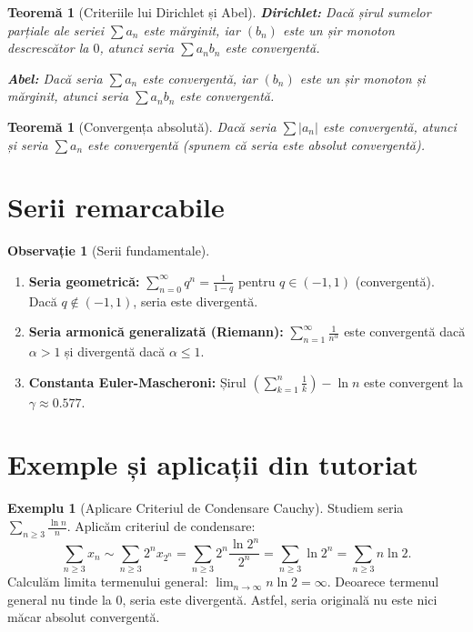 \documentclass[11pt,a4paper]{article}
\theoremstyle{definition}
\newtheorem{example}[definition]{Exemplu}
\newtheorem{remark}[definition]{Observație}
\theoremstyle{plain}
\newtheorem{theorem}[definition]{Teoremă}
\theoremstyle{remark}
\begin{document}
\begin{theorem}[Criteriile lui Dirichlet și Abel]
    \textbf{Dirichlet:} Dacă șirul sumelor parțiale ale seriei $\sum a_n$ este mărginit, iar $(b_n)$ este un șir monoton descrescător la $0$, atunci seria $\sum a_n b_n$ este convergentă.
    \par\smallskip
    \textbf{Abel:} Dacă seria $\sum a_n$ este convergentă, iar $(b_n)$ este un șir monoton și mărginit, atunci seria $\sum a_n b_n$ este convergentă.
\end{theorem}

\begin{theorem}[Convergența absolută]
    Dacă seria $\sum |a_n|$ este convergentă, atunci și seria $\sum a_n$ este convergentă (spunem că seria este \textit{absolut convergentă}).
\end{theorem}

\section{Serii remarcabile}

\begin{remark}[Serii fundamentale]
    \begin{enumerate}[label=\arabic*)]
        \item \textbf{Seria geometrică:} $\displaystyle\sum_{n=0}^\infty q^n = \frac{1}{1-q}$ pentru $q \in (-1, 1)$ (convergentă). Dacă $q \notin (-1, 1)$, seria este divergentă.
        \item \textbf{Seria armonică generalizată (Riemann):} $\displaystyle\sum_{n=1}^\infty \frac{1}{n^\alpha}$ este convergentă dacă $\alpha > 1$ și divergentă dacă $\alpha \le 1$.
        \item \textbf{Constanta Euler-Mascheroni:} Șirul $\displaystyle\left(\sum_{k=1}^n \frac{1}{k}\right) - \ln n$ este convergent la $\gamma \approx 0.577$.
    \end{enumerate}
\end{remark}

\section{Exemple și aplicații din tutoriat}

\begin{example}[Aplicare Criteriul de Condensare Cauchy]
    Studiem seria $\displaystyle \sum_{n \ge 3} \frac{\ln n}{n}$. Aplicăm criteriul de condensare:
    \[
        \sum_{n \ge 3} x_n \sim \sum_{n \ge 3} 2^n x_{2^n} = \sum_{n \ge 3} 2^n \frac{\ln 2^n}{2^n} = \sum_{n \ge 3} \ln 2^n = \sum_{n \ge 3} n \ln 2.
    \]
    Calculăm limita termenului general: $\lim_{n \to \infty} n \ln 2 = \infty$. Deoarece termenul general nu tinde la $0$, seria este divergentă. Astfel, seria originală nu este nici măcar absolut convergentă.
\end{example}
\end{document}
